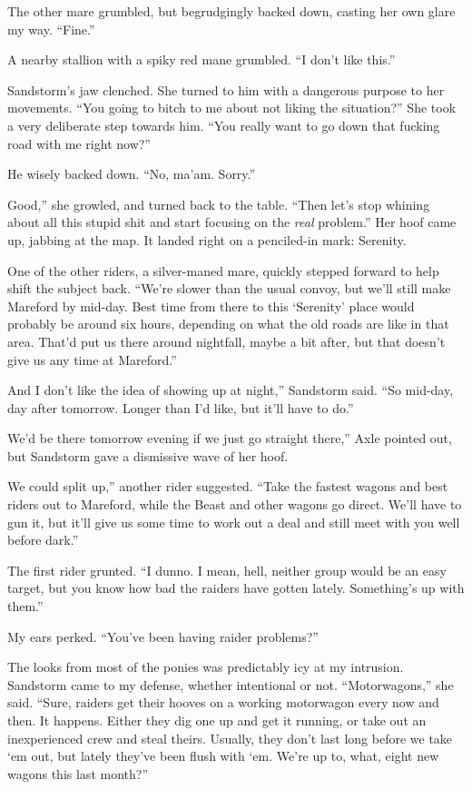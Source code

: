 The other mare grumbled, but begrudgingly backed down, casting her own glare my way. “Fine.”

A nearby stallion with a spiky red mane grumbled. “I don’t like this.”

Sandstorm’s jaw clenched. She turned to him with a dangerous purpose to her movements. “You going to bitch to me about not liking the situation?” She took a very deliberate step towards him. “You really want to go down that fucking road with me right now?”

He wisely backed down. “No, ma’am. Sorry.”

\leavevmode{}Good,” she growled, and turned back to the table. “Then let’s stop whining about all this stupid shit and start focusing on the \textit{real} problem.” Her hoof came up, jabbing at the map. It landed right on a penciled-in mark: Serenity.

One of the other riders, a silver-maned mare, quickly stepped forward to help shift the subject back. “We’re slower than the usual convoy, but we’ll still make Mareford by mid-day. Best time from there to this ‘Serenity’ place would probably be around six hours, depending on what the old roads are like in that area. That’d put us there around nightfall, maybe a bit after, but that doesn’t give us any time at Mareford.”

\leavevmode{}And I don’t like the idea of showing up at night,” Sandstorm said. “So mid-day, day after tomorrow. Longer than I’d like, but it’ll have to do.”

\leavevmode{}We’d be there tomorrow evening if we just go straight there,” Axle pointed out, but Sandstorm gave a dismissive wave of her hoof.

\leavevmode{}We could split up,” another rider suggested. “Take the fastest wagons and best riders out to Mareford, while the Beast and other wagons go direct. We’ll have to gun it, but it’ll give us some time to work out a deal and still meet with you well before dark.”

The first rider grunted. “I dunno. I mean, hell, neither group would be an easy target, but you know how bad the raiders have gotten lately. Something’s up with them.”

My ears perked. “You’ve been having raider problems?”

The looks from most of the ponies was predictably icy at my intrusion. Sandstorm came to my defense, whether intentional or not. “Motorwagons,” she said. “Sure, raiders get their hooves on a working motorwagon every now and then. It happens. Either they dig one up and get it running, or take out an inexperienced crew and steal theirs. Usually, they don’t last long before we take ‘em out, but lately they’ve been flush with ‘em. We’re up to, what, eight new wagons this last month?”

